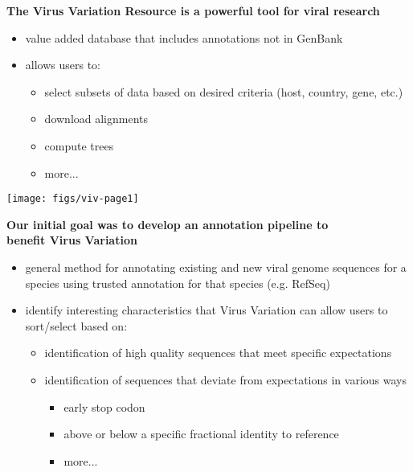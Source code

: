 \documentclass[landscape]{slides}
\begin{document}
\begin{slide}
\begin{center}
\textbf{The Virus Variation Resource is a powerful tool for viral research}

\begin{minipage}[c]{4in}
\tiny
\begin{itemize}
\item value added database that includes annotations not in GenBank
\item allows users to: 
\begin{itemize}
  \item select subsets of data based on desired criteria
    (host, country, gene, etc.)
  \item download alignments
  \item  compute trees
  \item  more...
\end{itemize}
\end{itemize}
\vfill
\end{minipage}
\begin{minipage}[c]{6in}
\texttt{[image: figs/viv-page1]}
\vfill
\end{minipage}

\vfill
\end{center}
\end{slide}
\begin{slide}
\begin{center}
\textbf{Our initial goal was to develop an annotation pipeline to \\ benefit Virus Variation}

\small
\begin{itemize}
\item general method for annotating existing and new viral genome
  sequences for a species using trusted annotation for that species (e.g. RefSeq)
\item identify interesting characteristics that Virus Variation can
  allow users to sort/select based on:
\begin{itemize}
  \item identification of high quality sequences that meet specific expectations
  \item identification of sequences that deviate from expectations in
    various ways
    \begin{itemize}
      \item early stop codon
      \item above or below a specific fractional identity to reference 
      \item more...
    \end{itemize}
\end{itemize}
\end{itemize}

\end{center}
\vfill
\end{slide}
\end{document}
